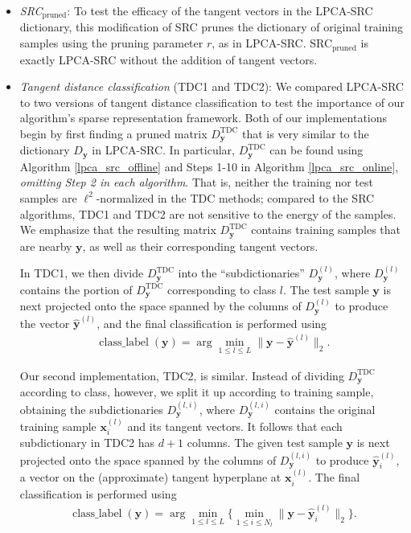 \documentclass[review]{elsarticle}
\newcommand{\classlabel}{\operatorname{class\_label}}
\begin{document}
\begin{itemize}[noitemsep,nolistsep]

\item \textit{SRC$_\mathrm{pruned}$}: To test the efficacy of the tangent vectors in the LPCA-SRC dictionary, this modification of SRC prunes the dictionary of original training samples using the pruning parameter $r$, as in LPCA-SRC. SRC$_{\mathrm{pruned}}$ is exactly LPCA-SRC without the addition of tangent vectors.

\item \textit{Tangent distance classification} (TDC1 and TDC2): We compared LPCA-SRC to two versions of tangent distance classification to test the importance of our algorithm's sparse representation framework. Both of our implementations begin by first finding a pruned matrix $D_{\bm{y}}^{\mathrm{TDC}}$ that is very similar to the dictionary $D_{\bm{y}}$ in LPCA-SRC. In particular, $D_{\bm{y}}^{\mathrm{TDC}}$ can be found using Algorithm \ref{lpca_src_offline} and Steps 1-10 in Algorithm \ref{lpca_src_online}, \emph{omitting Step 2 in each algorithm}. That is, neither the training nor test samples are $\ell^2$-normalized in the TDC methods; compared to the SRC algorithms, TDC1 and TDC2 are not sensitive to the energy of the samples. We emphasize that the resulting matrix $D_{\bm{y}}^{\mathrm{TDC}}$ contains training samples that are nearby $\bm{y}$, as well as their corresponding tangent vectors.


In TDC1, we then divide $D_{\bm{y}}^{\mathrm{TDC}}$ into the ``subdictionaries'' 
$D_{\bm{y}}^{(l)}$, where $D_{\bm{y}}^{(l)}$ contains the portion of $D_{\bm{y}}^{\mathrm{TDC}}$ corresponding to class $l$. The test sample $\bm{y}$ is next projected onto the space spanned by the columns of $D_{\bm{y}}^{(l)}$ to produce the vector $\hat{\bm{y}}^{(l)}$, and the final classification is performed using
\begin{align*}
\classlabel(\bm{y}) = \arg \min_{1\leq l \leq L} \big\|\bm{y}-\hat{\bm{y}}^{(l)}\big\|_2.
\end{align*} 



Our second implementation, TDC2, is similar. Instead of dividing $D_{\bm{y}}^{\mathrm{TDC}}$ according to class, however, we split it up according to training sample, obtaining the subdictionaries $D_{\bm{y}}^{(l,i)}$, where $D_{\bm{y}}^{(l,i)}$ contains the original training sample $\bm{x}_i^{(l)}$ and its tangent vectors. It follows that each subdictionary in TDC2 has $d+1$ columns. The given test sample $\bm{y}$ is next projected onto the space spanned by the columns of $D_{\bm{y}}^{(l,i)}$ to produce $\hat{\bm{y}}_i^{(l)}$, a vector on the (approximate) tangent hyperplane at $\bm{x}^{(l)}_i$. The final classification is performed using
\begin{align*}
\classlabel(\bm{y}) = \arg \min_{1\leq l \leq L}\Big\{\min_{1\leq i \leq N_l} \big\|\bm{y}-\hat{\bm{y}}_i^{(l)}\big\|_2\Big\}.
\end{align*}



\end{itemize}
\end{document}
